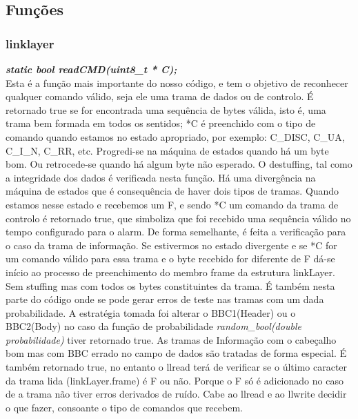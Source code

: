 \documentclass[a4paper]{article}
\begin{document}

\subsection{Funções}
\subsubsection{linklayer}
\textbf{\textit{static bool readCMD(uint8\_t * C);}}\\
Esta é a função mais importante do nosso código, e tem o objetivo de reconhecer
qualquer comando válido, seja ele uma trama de dados ou de controlo. É
retornado true se for encontrada uma sequência de bytes válida, isto é, uma
trama bem formada em todos os sentidos; *C é preenchido com o tipo de comando
quando estamos no estado apropriado,
por exemplo: C\_DISC, C\_UA, C\_I\_N, C\_RR, etc.
Progredi-se na máquina de estados quando há um byte bom. Ou retrocede-se
quando há algum byte não esperado. O destuffing, tal como a integridade dos
dados é verificada nesta função. Há uma divergência na máquina de estados que é
consequência de haver dois tipos de tramas. Quando estamos nesse estado e
recebemos um F, e sendo *C um comando da trama de controlo é retornado true,
que simboliza que foi recebido uma sequência válido no tempo configurado para o
alarm. De forma semelhante, é feita a verificação para o caso da trama de
informação. Se estivermos no estado divergente e se *C for um comando válido
para essa trama e o byte recebido for diferente de F dá-se início ao processo
de preenchimento do membro frame da estrutura linkLayer. Sem stuffing mas com
todos os bytes constituintes da trama. É também nesta parte do código onde se
pode gerar erros de teste nas tramas com um dada probabilidade. A estratégia
tomada foi alterar o BBC1(Header) ou o BBC2(Body) no caso da função de
probabilidade \textit{random\_bool(double probabilidade)} tiver retornado true.
As tramas de Informação com o cabeçalho bom mas com BBC errado no campo de
dados são tratadas de forma especial. É também retornado true, no entanto o
llread terá de verificar se o último caracter da trama lida (linkLayer.frame) é
F ou não. Porque o F só é adicionado no caso de a trama não tiver erros
derivados de ruído. Cabe ao llread e ao llwrite decidir o que fazer, consoante
o tipo de comandos que recebem.\linebreak
\end{document}
